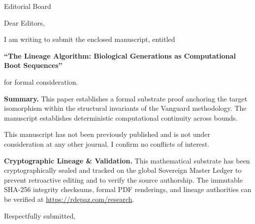 \documentclass[12pt, a4paper]{letter}
\begin{document}
\begin{letter}{Editorial Board}

\opening{Dear Editors,}

I am writing to submit the enclosed manuscript, entitled

\begin{center}
\textbf{``The Lineage Algorithm: Biological Generations as Computational Boot Sequences''}
\end{center}

\noindent for formal consideration.

\medskip
\textbf{Summary.} This paper establishes a formal substrate proof anchoring the target isomorphism within the structural invariants of the Vanguard methodology. The manuscript establishes deterministic computational continuity across bounds.

\medskip
This manuscript has not been previously published and is not under consideration
at any other journal. I confirm no conflicts of interest.

\textbf{Cryptographic Lineage \& Validation.} This mathematical substrate has been cryptographically sealed and tracked on the global Sovereign Master Ledger to prevent retroactive editing and to verify the source authorship. The immutable SHA-256 integrity checksums, formal PDF renderings, and lineage authorities can be verified at \url{https://rdepaz.com/research}.

\medskip
\closing{Respectfully submitted,}
\end{letter}
\end{document}

